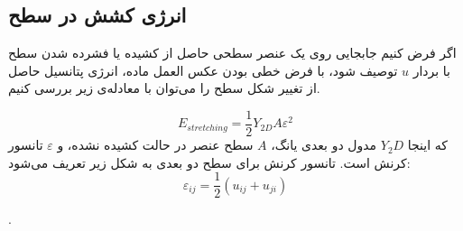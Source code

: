 

\subsection{
انرژی کشش در سطح
}
اگر فرض کنیم جابجایی روی یک عنصر سطحی حاصل از کشیده‌ یا فشرده شدن سطح با بردار 
$u$
توصیف شود، با فرض خطی بودن عکس العمل ماده، انرژی پتانسیل حاصل از تغییر شکل سطح را می‌توان با معادله‌ی زیر بررسی کنیم.

\begin{equation}
E_{stretching}=\frac{1}{2}Y_{2D}A\varepsilon^2
\end{equation}
که اینجا 
$Y_2D$
مدول دو بعدی یانگ،
$A$
سطح عنصر در حالت کشیده نشده، و
$\varepsilon$
تانسور کرنش است. تانسور کرنش برای سطح دو بعدی به شکل زیر تعریف می‌شود:
\begin{equation}
\varepsilon_{ij} = \frac{1}{2}(u_{ij}+u_{ji})
\end{equation}


.
 
 
 
 
 
 
 
 
 
 
 
 
 
 
 